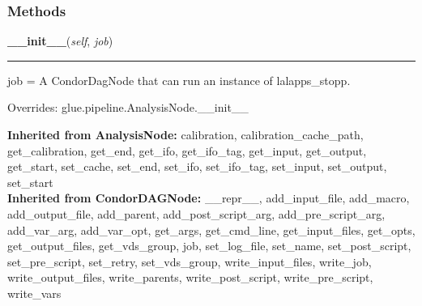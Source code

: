 
  \subsubsection{Methods}

    \label{stochastic:StoppNode:__init__}
    \vspace{0.5ex}

    \begin{boxedminipage}{\textwidth}

    \raggedright \textbf{\_\_init\_\_}(\textit{self}, \textit{job})

    \vspace{-1.5ex}

    \rule{\textwidth}{0.5\fboxrule}
    job = A CondorDagNode that can run an instance of lalapps\_stopp.

    \vspace{1ex}

      Overrides: glue.pipeline.AnalysisNode.\_\_init\_\_

    \end{boxedminipage}

  \textbf{Inherited from AnalysisNode:}
    calibration,
    calibration\_cache\_path,
    get\_calibration,
    get\_end,
    get\_ifo,
    get\_ifo\_tag,
    get\_input,
    get\_output,
    get\_start,
    set\_cache,
    set\_end,
    set\_ifo,
    set\_ifo\_tag,
    set\_input,
    set\_output,
    set\_start
    \\
  \textbf{Inherited from CondorDAGNode:}
    \_\_repr\_\_,
    add\_input\_file,
    add\_macro,
    add\_output\_file,
    add\_parent,
    add\_post\_script\_arg,
    add\_pre\_script\_arg,
    add\_var\_arg,
    add\_var\_opt,
    get\_args,
    get\_cmd\_line,
    get\_input\_files,
    get\_opts,
    get\_output\_files,
    get\_vds\_group,
    job,
    set\_log\_file,
    set\_name,
    set\_post\_script,
    set\_pre\_script,
    set\_retry,
    set\_vds\_group,
    write\_input\_files,
    write\_job,
    write\_output\_files,
    write\_parents,
    write\_post\_script,
    write\_pre\_script,
    write\_vars
